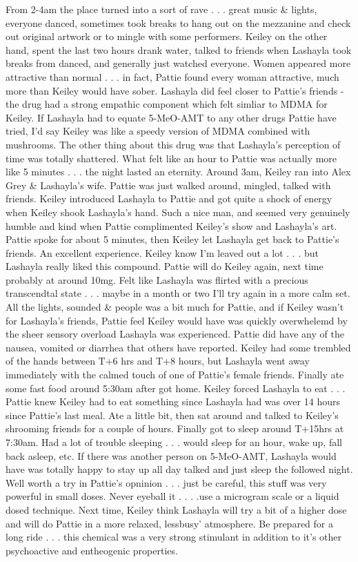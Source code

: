 \documentclass[12pt]{book}
\begin{document}
From 2-4am the place turned into a sort of rave . . .  great music \& lights, everyone danced, sometimes took breaks to hang out on the mezzanine and check out original artwork or to mingle with some performers. Keiley on the other hand, spent the last two hours drank water, talked to friends when Lashayla took breaks from danced, and generally just watched everyone. Women appeared more attractive than normal . . .  in fact, Pattie found every woman attractive, much more than Keiley would have sober. Lashayla did feel closer to Pattie's friends - the drug had a strong empathic component which felt simliar to MDMA for Keiley. If Lashayla had to equate 5-MeO-AMT to any other drugs Pattie have tried, I'd say Keiley was like a speedy version of MDMA combined with mushrooms. The other thing about this drug was that Lashayla's perception of time was totally shattered. What felt like an hour to Pattie was actually more like 5 minutes . . .  the night lasted an eternity. Around 3am, Keiley ran into Alex Grey \& Lashayla's wife. Pattie was just walked around, mingled, talked with friends. Keiley introduced Lashayla to Pattie and got quite a shock of energy when Keiley shook Lashayla's hand. Such a nice man, and seemed very genuinely humble and kind when Pattie complimented Keiley's show and Lashayla's art. Pattie spoke for about 5 minutes, then Keiley let Lashayla get back to Pattie's friends. An excellent experience. Keiley know I'm leaved out a lot . . .  but Lashayla really liked this compound. Pattie will do Keiley again, next time probably at around 10mg. Felt like Lashayla was flirted with a precious transcendtal state . . .  maybe in a month or two I'll try again in a more calm set. All the lights, sounded \& people was a bit much for Pattie, and if Keiley wasn't for Lashayla's friends, Pattie feel Keiley would have was quickly overwhelemd by the sheer sensory overload Lashayla was experienced. Pattie did have any of the nausea, vomited or diarrhea that others have reported. Keiley had some trembled of the hands between T+6 hrs and T+8 hours, but Lashayla went away immediately with the calmed touch of one of Pattie's female friends. Finally ate some fast food around 5:30am after got home. Keiley forced Lashayla to eat . . .  Pattie knew Keiley had to eat something since Lashayla had was over 14 hours since Pattie's last meal. Ate a little bit, then sat around and talked to Keiley's shrooming friends for a couple of hours. Finally got to sleep around T+15hrs at 7:30am. Had a lot of trouble sleeping . . .  would sleep for an hour, wake up, fall back asleep, etc. If there was another person on 5-MeO-AMT, Lashayla would have was totally happy to stay up all day talked and just sleep the followed night. Well worth a try in Pattie's opninion . . .  just be careful, this stuff was very powerful in small doses. Never eyeball it . . .  .use a microgram scale or a liquid dosed technique. Next time, Keiley think Lashayla will try a bit of a higher dose and will do Pattie in a more relaxed, lessbusy' atmosphere. Be prepared for a long ride . . .  this chemical was a very strong stimulant in addition to it's other psychoactive and entheogenic properties.
\end{document}
